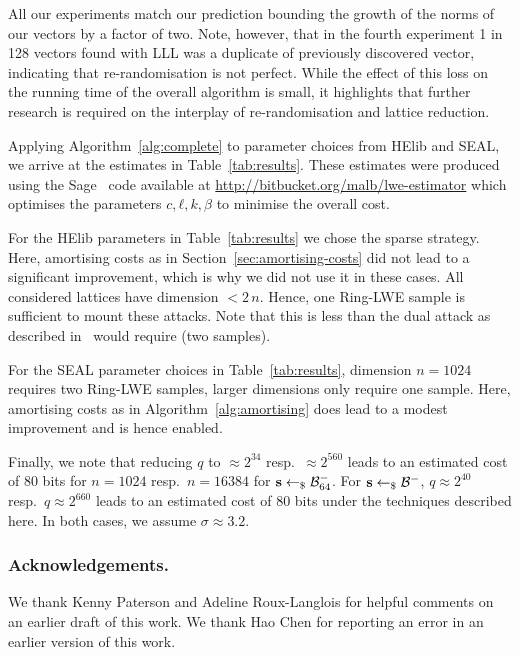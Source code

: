 \documentclass[a4paper]{llncs}
\def\isanonymous{0}
\newcommand{\anonymous}[2]{
\ifthenelse{\equal{\isanonymous}{1}}
{{#1}}
{{#2}}
}
\begin{document}
\begin{enumerate}
\end{enumerate}

All our experiments match our prediction bounding the growth of the norms of our vectors by a factor of two. Note, however, that in the fourth experiment 1 in 128 vectors found with LLL was a duplicate of previously discovered vector, indicating that re-randomisation is not perfect. While the effect of this loss on the running time of the overall algorithm is small, it highlights that further research is required on the interplay of re-randomisation and lattice reduction.

Applying Algorithm~\ref{alg:complete} to parameter choices from HElib and SEAL, we arrive at the estimates in Table~\ref{tab:results}. These estimates were produced using the Sage~\cite{sagemath} code available at \url{http://bitbucket.org/malb/lwe-estimator} which optimises the parameters \(c, ℓ, k, β\) to minimise the overall cost.

For the HElib parameters in Table~\ref{tab:results} we chose the sparse strategy. Here, amortising costs as in Section~\ref{sec:amortising-costs} did not lead to a significant improvement, which is why we did not use it in these cases. All considered lattices have dimension $<2\,n$. Hence, one Ring-LWE sample is sufficient to mount these attacks. Note that this is less than the dual attack as described in~\cite{C:GenHalSma12} would require (two samples).

For the SEAL parameter choices in Table~\ref{tab:results}, dimension $n=1024$  requires two Ring-LWE samples, larger dimensions only require one sample. Here, amortising costs as in Algorithm~\ref{alg:amortising} does lead to a modest improvement and is hence enabled.

Finally, we note that reducing \(q\) to \(\approx 2^{34}\) resp.\ \(\approx 2^{560}\) leads to an estimated cost of 80 bits for \(n=1024\) resp.\ \(n=16384\) for \(\s \sample \B[64]{-}\). For \(\s \sample \B{-}\), \(q \approx 2^{{40}}\) resp.\ \(q \approx 2^{660}\) leads to an estimated cost of 80 bits under the techniques described here. In both cases, we assume \(\sigma \approx 3.2\).

\anonymous{}{
\subsubsection{Acknowledgements.} We thank Kenny Paterson and Adeline Roux-Langlois for helpful comments on an earlier draft of this work. We thank Hao Chen for reporting an error in an earlier version of this work.
}
\end{document}
